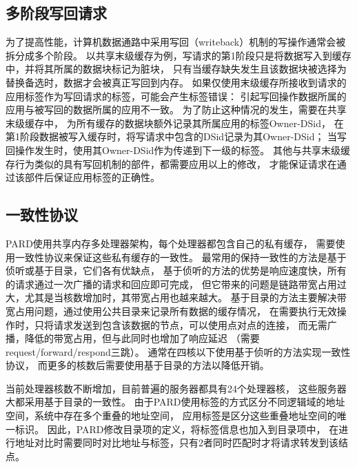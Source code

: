 %




\subsection{多阶段写回请求}
\label{chap:labeladdrspace:propagation:cache}

为了提高性能，计算机数据通路中采用写回（writeback）机制的写操作通常会被拆分成多个阶段。
以共享末级缓存为例，写请求的第1阶段只是将数据写入到缓存中，并将其所属的数据块标记为脏块，
只有当缓存缺失发生且该数据块被选择为替换备选时，数据才会被真正写回到内存。
如果仅使用末级缓存所接收到请求的应用标签作为写回请求的标签，可能会产生标签错误：
引起写回操作数据所属的应用与被写回的数据所属的应用不一致。
为了防止这种情况的发生，需要在共享末级缓存中，
为所有缓存的数据块额外记录其所属应用的标签Owner-DSid，
在第1阶段数据被写入缓存时，将写请求中包含的DSid记录为其Owner-DSid；
当写回操作发生时，使用其Owner-DSid作为传递到下一级的标签。
其他与共享末级缓存行为类似的具有写回机制的部件，都需要应用以上的修改，
才能保证请求在通过该部件后保证应用标签的正确性。


\subsection{一致性协议}

PARD使用共享内存多处理器架构，每个处理器都包含自己的私有缓存，
需要使用一致性协议来保证这些私有缓存的一致性。
最常用的保持一致性的方法是基于侦听或基于目录，它们各有优缺点，
基于侦听的方法的优势是响应速度快，所有的请求通过一次广播的请求和回应即可完成，
但它带来的问题是链路带宽占用过大，尤其是当核数增加时，其带宽占用也越来越大。
基于目录的方法主要解决带宽占用问题，通过使用公共目录来记录所有数据的缓存情况，
在需要执行无效操作时，只将请求发送到包含该数据的节点，可以使用点对点的连接，
而无需广播，降低的带宽占用，但与此同时也增加了响应延迟
（需要request/forward/respond三跳）。
通常在四核以下使用基于侦听的方法实现一致性协议，
而更多的核数后需要使用基于目录的方法以降低开销。

当前处理器核数不断增加，目前普遍的服务器都具有24个处理器核，
这些服务器大都采用基于目录的一致性。
由于PARD使用标签的方式区分不同逻辑域的地址空间，系统中存在多个重叠的地址空间，
应用标签是区分这些重叠地址空间的唯一标识。
因此，PARD修改目录项的定义，将标签信息也加入到目录项中，
在进行地址对比时需要同时对比地址与标签，只有2者同时匹配时才将请求转发到该结点。


